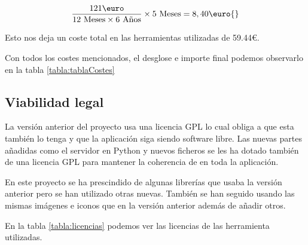 \[\frac{121\text{\euro}}{12 \text{ Meses}\times6 \text{ Años}} \times 5 \text{ Meses} =  8,40\text{\euro{}} \]

Esto nos deja un coste total en las herramientas utilizadas de 59.44\euro{}.

Con todos los costes mencionados, el desglose e importe final podemos observarlo en la tabla \ref{tabla:tablaCostes}



\subsection{Viabilidad legal}

La versión anterior del proyecto \cite{perikymataV1} usa una licencia GPL \cite{wiki:GPL} lo cual obliga a que esta también lo tenga y que la aplicación siga siendo software libre. Las nuevas partes añadidas como el servidor en Python y nuevos ficheros se les ha dotado también de una licencia GPL para mantener la coherencia de en toda la aplicación.

En este proyecto se ha prescindido de algunas librerías que usaba la versión anterior pero se han utilizado otras nuevas. También se han seguido usando las mismas imágenes e iconos que en la versión anterior además de añadir otros.

En la tabla \ref{tabla:licencias} podemos ver las licencias de las herramienta utilizadas.


